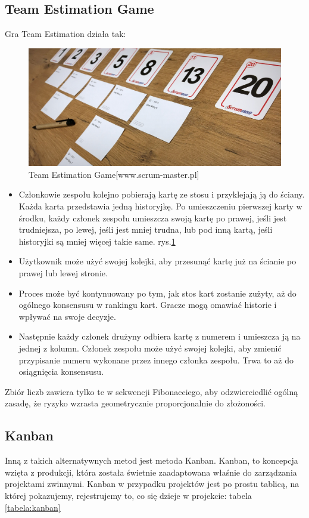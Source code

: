 \subsection{Team Estimation Game}

Gra Team Estimation działa tak:

\begin{figure}
	\centering\includegraphics[width=.4\textwidth]{img/team_estimation_game}
	\caption{Team Estimation Game[www.scrum-master.pl]}\label{rysunek:teamEstimationGaem}
\end{figure}

\begin{itemize}
	\item Członkowie zespołu kolejno pobierają kartę ze stosu i przyklejają ją do ściany. Każda karta przedstawia jedną historyjkę. Po umieszczeniu pierwszej karty w środku, każdy członek zespołu umieszcza swoją kartę po prawej, jeśli jest trudniejsza, po lewej, jeśli jest mniej trudna, lub pod inną kartą, jeśli historyjki są mniej więcej takie same. rys.\ref{rysunek:teamEstimationGaem}
	\item Użytkownik może użyć swojej kolejki, aby przesunąć kartę już na ścianie po prawej lub lewej stronie.
	\item Proces może być kontynuowany po tym, jak stos kart zostanie zużyty, aż do ogólnego konsensusu w rankingu kart. Gracze mogą omawiać historie i wpływać na swoje decyzje.
	\item Następnie każdy członek drużyny odbiera kartę z numerem i umieszcza ją na jednej z kolumn. Członek zespołu może użyć swojej kolejki, aby zmienić przypisanie numeru wykonane przez innego członka zespołu. Trwa to aż do osiągnięcia konsensusu.
\end{itemize}

Zbiór liczb zawiera tylko te w sekwencji Fibonacciego, aby odzwierciedlić ogólną zasadę, że ryzyko wzrasta geometrycznie proporcjonalnie do złożoności.

\subsection{Kanban}

Inną z takich alternatywnych metod jest metoda Kanban. Kanban, to koncepcja wzięta z produkcji, która została świetnie zaadaptowana właśnie do zarządzania projektami zwinnymi. Kanban w przypadku projektów jest po prostu tablicą, na której pokazujemy, rejestrujemy to, co się dzieje w projekcie: tabela \ref{tabela:kanban}

